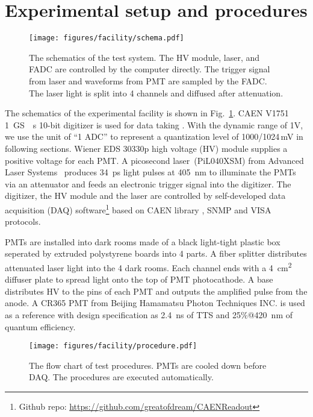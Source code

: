 \section{Experimental setup and procedures}
\label{SetUp}
\begin{figure}[!htbp]
    \centering
    \texttt{[image: figures/facility/schema.pdf]}
    \caption{The schematics of the test system. The HV module, laser, and FADC are controlled by the computer directly. The trigger signal from laser and waveforms from PMT are sampled by the FADC. The laser light is split into 4 channels and diffused after attenuation.}
    \label{fig:facility}
\end{figure}

The schematics of the experimental facility is shown in Fig.~\ref{fig:facility}. CAEN V1751 \SI{1}{GS \per s} 10-bit digitizer is used for data taking \cite{CAENV1751}. With the dynamic range of 1V, we use the unit of ``1 ADC''  to represent a quantization level of 1000/1024\,mV \cite{JUNOPrototype} in following sections. Wiener EDS 30330p high voltage (HV) module \cite{WIENERHV} supplies a positive voltage for each PMT. A picosecond laser~(PiL040XSM) from Advanced Laser Systems~\cite{NTKLaser} produces \SI{34}{ps} light pulses at \SI{405}{nm} to illuminate the PMTs via an attenuator and feeds an electronic trigger signal into the digitizer. The digitizer, the HV module and the laser are controlled by self-developed data acquisition (DAQ) software\footnote{Github repo: \url{https://github.com/greatofdream/CAENReadout}} based on CAEN library \cite{CAENLIB}, SNMP \cite{SNMP} and VISA \cite{VISA} protocols.

PMTs are installed into dark rooms made of a black light-tight plastic box seperated by extruded polystyrene boards into 4 parts. A fiber splitter distributes attenuated laser light into the 4 dark rooms. Each channel ends with a \SI{4}{cm\tothe{2}} diffuser plate to spread light onto the top of PMT photocathode.
A base distributes HV to the pins of each PMT and outputs the amplified pulse from the anode. A CR365 PMT \cite{BJBS} from Beijing Hamamatsu Photon Techniques INC. is used as a reference with design specification as \SI{2.4}{ns} of TTS and 25\%@\SI{420}{nm} of quantum efficiency.

\begin{figure}
    \centering
    \texttt{[image: figures/facility/procedure.pdf]}
    \caption{The flow chart of test procedures. PMTs are cooled down before DAQ. The procedures are executed automatically.}
    \label{fig:testingprocedure}
\end{figure}

